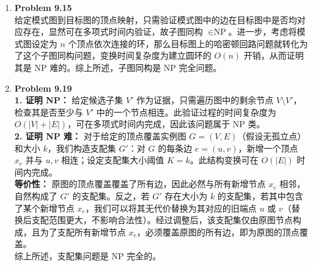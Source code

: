 \documentclass{ctexart}
\begin{document}
\begin{enumerate}[label=\arabic*.]
        已知 $\Pi'$ 是 NP 完全问题，根据 NP 完全性的定义，对于任意的问题 $\Pi'' \in \text{NP}$，都有 $\Pi'' \le_p \Pi'$。\\
        又已知题目给出 $\Pi' \le_p \Pi$，由于\textbf{多项式时间规约具有传递性}，因此对于任意的 $\Pi'' \in \text{NP}$，均有 $\Pi'' \le_p \Pi$。这证明了 $\Pi$ 是 NP难的。\\
        同时，题目已知条件给定了 $\Pi \in \text{NP}$。由于 $\Pi$ 既是 NP 难的，又属于 NP 问题类，根据定义，$\Pi$ 是NP完全问题。证毕。
    \item \textbf{Problem 9.15}\\
        给定模式图到目标图的顶点映射，只需验证模式图中的边在目标图中是否均对应存在，显然可在多项式时间内验证，故子图同构 $\in \text{NP}$。进一步，考虑将模式图设定为 $n$ 个顶点依次连接的环，那么目标图上的哈密顿回路问题就转化为了这个子图同构问题，变换时间复杂度为建立圆环的 $O(n)$ 开销，从而证明其是 NP 难的。综上所述，子图同构是 NP 完全问题。
    \item \textbf{Problem 9.19}\\
        \textbf{1. 证明 NP：} 给定候选子集 $V'$ 作为证据，只需遍历图中的剩余节点 $V \setminus V'$，检查其是否至少与 $V'$ 中的一个节点相连。此验证过程的时间复杂度为 $O(|V|+|E|)$，可在多项式时间内完成，因此该问题属于 NP 类。\\
        \textbf{2. 证明 NP 难：} 对于给定的顶点覆盖实例图 $G=(V,E)$（假设无孤立点）和大小 $k$，我们构造支配集 $G'$：对 $G$ 的每条边 $e=(u,v)$，新增一个顶点 $x_e$ 并与 $u, v$ 相连；设定支配集大小阈值 $K=k$。此结构变换可在 $O(|E|)$ 时间内完成。\\
        \textbf{等价性：} 原图的顶点覆盖覆盖了所有边，因此必然与所有新增节点 $x_e$ 相邻，自然构成了 $G'$ 的支配集。反之，若 $G'$ 存在大小为 $k$ 的支配集，若其中包含了某个新增节点 $x_e$，我们可以将其无代价替换为其对应的旧端点 $u$ 或 $v$（替换后支配范围更大，不影响合法性）。经过调整后，该支配集仅由原图节点构成，且为了支配所有新增节点 $x_e$，必须覆盖原图的所有边，即为原图的顶点覆盖。\\
        综上所述，支配集问题是 NP 完全的。
\end{enumerate}
\end{document}

